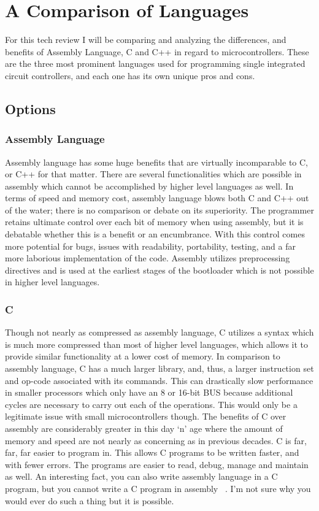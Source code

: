 \documentclass[10pt,letterpaper,onecolumn,journal]{IEEEtran}
\begin{document}
\section{A Comparison of Languages}
For this tech review I will be comparing and analyzing the differences, and benefits of Assembly Language, C and C++ in regard to microcontrollers. These are the three most prominent languages used for programming single integrated circuit controllers, and each one has its own unique pros and cons.

\subsection{Options}
\subsubsection{Assembly Language}
Assembly language has some huge benefits that are virtually incomparable to C, or C++ for that matter. There are several functionalities which are possible in assembly which cannot be accomplished by higher level languages as well. In terms of speed and memory cost, assembly language blows both C and C++ out of the water; there is no comparison or debate on its superiority. The programmer retains ultimate control over each bit of memory when using assembly, but it is debatable whether this is a benefit or an encumbrance. With this control comes more potential for bugs, issues with readability, portability, testing, and a far more laborious implementation of the code. Assembly utilizes preprocessing directives and is used at the earliest stages of the bootloader which is not possible in higher level languages.
\subsubsection{C}
Though not nearly as compressed as assembly language, C utilizes a syntax which is much more compressed than most of higher level languages, which allows it to provide similar functionality at a lower cost of memory. In comparison to assembly language, C has a much larger library, and, thus, a larger instruction set and op-code associated with its commands. This can drastically slow performance in smaller processors which only have an 8 or 16-bit BUS because additional cycles are necessary to carry out each of the operations. This would only be a legitimate issue with small microcontrollers though. The benefits of C over assembly are considerably greater in this day ‘n’ age where the amount of memory and speed are not nearly as concerning as in previous decades. C is far, far, far easier to program in. This allows C programs to be written faster, and with fewer errors. The programs are easier to read, debug, manage and maintain as well. An interesting fact, you can also write assembly language in a C program, but you cannot write a C program in assembly ~\cite{codeproject}. I’m not sure why you would ever do such a thing but it is possible. 
\end{document}
